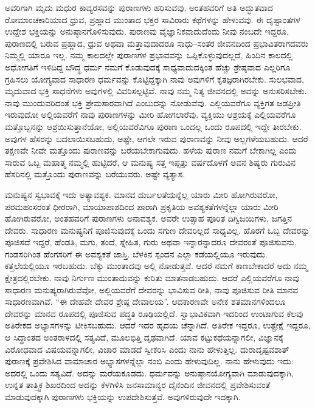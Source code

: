 \vskip 5pt

ಅವರಿಗಾಗಿ ಮೃದು ಮಧುರ ಕಾವ್ಯರಸವನ್ನು ಪುರಾಣಗಳು ಹರಿಸುವವು. ಅಂತಹವರಿಗೆ ಅತಿ ಅದ್ಭುತವಾದ ರೋಮಾಂಚಕಾರಿಯಾದ ಧ್ರುವ, ಪ್ರಹ್ಲಾದ ಮುಂತಾದ ಭಕ್ತರ ಸಾವಿರಾರು ಕಥೆಗಳನ್ನು ಹೇಳುವವು. ಈ ದೃಷ್ಟಾಂತಗಳ ಉದ್ದೇಶ ಭಕ್ತಿಯನ್ನು ಅನುಷ್ಠಾನಗೊಳಿಸುವುದು. ಪುರಾಣವು ವೈಜ್ಞಾನಿಕವಾದುದೆಂದು ನೀವು ನಂಬದೇ ಇದ್ದರೂ, ಪುರಾಣದಲ್ಲಿ ಬರುವ ಪ್ರಹ್ಲಾದ, ಧ್ರುವ ಅಥವಾ ಮತ್ತಾವುದಾದರೂ ಸಾಧು–ಸಂತರ ಜೀವನದಿಂದ ಪ್ರಭಾವಿತರಾಗದವರು ನಿಮ್ಮಲ್ಲಿ ಯಾರೂ ಇಲ್ಲ. ನಮ್ಮ ಕಾಲದಲ್ಲೇ ಪುರಾಣಗಳ ಪ್ರಭಾವವನ್ನು ಒಪ್ಪಿಕೊಳ್ಳುವುದಲ್ಲದೆ, ಹಿಂದಿನ ಕಾಲದಲ್ಲಿ ಅಧೋಗತಿಗೆ ಇಳಿದಿದ್ದ ಬೌದ್ಧ ಧರ್ಮ ನಮಗೆ ಕೊಡುವುದಕ್ಕೆ ಸಾಧ್ಯವಾದುದಕ್ಕಿಂತ ಹೆಚ್ಚು ಶ್ರೇಷ್ಠವಾದ ಎಲ್ಲರಿಗೂ ಗ್ರಹಿಸಲು ಯೋಗ್ಯವಾದ ಸಾಧಾರಣ ಧರ್ಮವನ್ನು ಕೊಟ್ಟಿದ್ದಕ್ಕಾಗಿ ನಾವು ಅವುಗಳಿಗೆ ಕೃತಜ್ಞರಾಗಿರಬೇಕು. ಸುಲಭವಾದ, ಮೃದುವಾದ ಭಕ್ತಿ ಸಾಧನೆಗಳು ಅವುಗಳಲ್ಲಿ ವಿವರಿಸಲ್ಪಟ್ಟಿವೆ. ನಾವು ನಮ್ಮ ನಿತ್ಯ ಜೀವನದಲ್ಲಿ ಅವನ್ನು ಅನುಸರಿಸಬೇಕು. ನಾವು ಮುಂದುವರಿದಂತೆ ಭಕ್ತಿ ಪ್ರೇಮಸಾರವಾಗಿದೆ ಎಂಬುದನ್ನು ನೋಡುವೆವು. ಎಲ್ಲಿಯವರೆಗೂ ವ್ಯಕ್ತಿಗತ ಜಡಪ್ರೀತಿ ಇರುವುದೋ ಅಲ್ಲಿಯವರೆಗೆ ನಾವು ಪುರಾಣಗಳನ್ನು ಮೀರಿ ಹೋಗಲಾರೆವು. ವ್ಯಕ್ತಿಯು ಆಶ್ರಯಕ್ಕೆ ಎಲ್ಲಿಯವರೆಗೂ ಮತ್ತೊಬ್ಬನನ್ನು ಆಶ್ರಯಿಸುತ್ತಾನೆಯೋ, ಅಲ್ಲಿಯವರೆವಿಗೂ ಪುರಾಣ ಒಂದಲ್ಲ ಒಂದು ರೂಪದಲ್ಲಿ ಇದ್ದೇ ತೀರಬೇಕು. ಅವುಗಳ ಹೆಸರನ್ನು ಬದಲಾಯಿಸಬಹುದು, ಅಷ್ಟೇ, ಆಗಲೇ ಇರುವ ಪುರಾಣವನ್ನು ನೀವು ಅಲ್ಲಗಳೆಯಬಹುದು. ಆದರೆ ತಕ್ಷಣವೇ ನೀವೇ ಮತ್ತೊಂದು ಪುರಾಣವನ್ನು ಬರೆಯಬೇಕಾಗುವುದು. ಹಳೆಯ ಪುರಾಣ ನಮಗೆ ಬೇಕಾಗಿಲ್ಲ ಎಂದು ಸಾರುವ ಒಬ್ಬ ಮಹಾತ್ಮ ನಮ್ಮಲ್ಲಿ ಹುಟ್ಟಿದರೆ, ಆ ಮನುಷ್ಯ ಸತ್ತ ಇಪ್ಪತ್ತು ವರ್ಷದೊಳಗೆ ಅವನ ಶಿಷ್ಯರು ಗುರುವಿನ ಹೆಸರಿನಲ್ಲಿ ಮತ್ತೊಂದು ಪುರಾಣವನ್ನು ಬರೆಯುವರು. ಅಷ್ಟೇ ವ್ಯತ್ಯಾಸ.

ಮನುಷ್ಯನ ಸ್ವಭಾವಕ್ಕೆ ಇದು ಅತ್ಯಾವಶ್ಯಕ. ಮಾನವ ದುರ್ಬಲತೆಯನ್ನೆಲ್ಲ ಯಾರು ಮೀರಿ ಹೋಗಿರುವರೋ, ಪರಮಹಂಸರಂತೆ ಧೀರರಾಗಿ, ಮಾಯಾಪಾಶದಿಂದ ಪಾರಾಗಿ ಪ್ರಕೃತಿಯ ಅವಶ್ಯಕತೆಗಳನ್ನೆಲ್ಲಾ ಯಾರು ಮೀರಿ ಹೋಗಿರುವರೋ, ಅಂತಹವರಿಗೆ ಪುರಾಣಗಳು ಅನಾವಶ್ಯಕ. ಅವರೇ ಉತ್ಸಾಹ ಪೂರಿತ ದಿಗ್ವಿಜಯಿಗಳು, ಜಗತ್ತಿನ ದೇವರು. ಸಾಧಾರಣ ಮನುಷ್ಯನಿಗೆ ಪೂಜಿಸುವುದಕ್ಕೆ ಒಂದು ಸಗುಣ ದೇವರಿಲ್ಲದೆ ಸಾಧ್ಯವಿಲ್ಲ. ಹೊರಗೆ ಒಬ್ಬ ದೇವರನ್ನು ಪೂಜಿಸದೆ ಇದ್ದರೆ, ಹೆಂಡತಿ, ಮಗು, ತಂದೆ, ಸ್ನೇಹಿತ, ಗುರು ಅಥವಾ ಇನ್ನಾರನ್ನಾದರೂ ದೇವರಂತೆ ಪೂಜಿಸುವನು. ಗಂಡಸರಿಗಿಂತ ಹೆಂಗಸರಿಗೆ ಈ ಅವಶ್ಯಕತೆ ಜಾಸ್ತಿ. ಬೆಳಕಿನ ಸ್ಪಂದನ ಎಲ್ಲಾ ಕಡೆಯಲ್ಲಿಯೂ ಇರುವುದು. ಕತ್ತಲೆಯಲ್ಲಿಯೂ ಇರಬಹುದು. ಬೆಕ್ಕು ಮುಂತಾದವು ಅಲ್ಲಿ ನೋಡುತ್ತವೆ. ಆದರೆ ನಮಗೆ ಕಾಣಬೇಕಾದರೆ ಅದು ನಮ್ಮ ಕ್ಷೇತ್ರದಲ್ಲಿರಬೇಕು. ನಾವು ನಿರ್ಗುಣ ಮುಂತಾದುವನ್ನು ಕುರಿತು ಮಾತನಾಡಬಹುದು. ಆದರೆ ಎಲ್ಲಿಯವರೆಗೂ ನಾವು ಸಾಧಾರಣ ಮನುಷ್ಯರಾಗಿರುವೆವೋ, ಅಲ್ಲಿಯವರೆಗೆ ದೇವರನ್ನು ಭಾವಿಸುವ ರೀತಿ, ನಾವು ಪೂಜಿಸುವ ರೀತಿ ಮಾನವ ಸಾಧಾರಣವಾಗಿವೆ. “ಈ ದೇಹವೇ ದೇವರ ಶ್ರೇಷ್ಠ ದೇವಾಲಯ”. ಆದಕಾರಣವೇ ಅನೇಕ ಶತಮಾನಗಳಿಂದಲೂ ದೇವರನ್ನು ಮಾನವ ರೂಪದಲ್ಲಿ ಪೂಜಿಸುವ ಪದ್ಧತಿ ರೂಢಿಯಲ್ಲಿದೆ. ಸ್ವಾಭಾವಿಕವಾಗಿ ಇದರಿಂದ ಉಂಟಾಗುವ ಕೆಲವು ಅತಿರೇಕದ ಅಭ್ಯಾಸಗಳನ್ನು ಟೀಕಿಸಬಹುದು. ಆದರೆ ಇದರ ಹೃದಯ ಚೆನ್ನಾಗಿದೆ. ಅತಿರೇಕ ಇದ್ದರೂ, ಉತ್ಪ್ರೇಕ್ಷೆ ಇದ್ದರೂ, ಆ ಸಿದ್ಧಾಂತದ ಅಂತರಾಳದಲ್ಲಿ ಸತ್ಯವಿದೆ, ಮೂಲಭಿತ್ತಿ ದೃಢವಾಗಿದೆ. ಯಾವ ಕಟ್ಟುಕಥೆಯನ್ನಾಗಲೀ, ವಿಜ್ಞಾನಕ್ಕೆ ವಿರೋಧವಾದ ವಿಷಯವನ್ನಾಗಲೀ, ವಿಚಾರ ಮಾಡದೆ ಸ್ವೀಕರಿಸಿ ಎಂದು ನಾನು ಹೇಳುತ್ತಿಲ್ಲ. ದುರಾದೃಷ್ಟವಶಾತ್​ ಪುರಾಣಕ್ಕೆ ಪ್ರವೇಶಿಸಿದ ವಾಮಾಚಾರ ಅಭ್ಯಾಸಗಳನ್ನೆಲ್ಲಾ ನಂಬಿ ಎಂದು ಹೇಳುವುದಿಲ್ಲ. ನಾನು ಹೇಳುವುದು ಇದು: ಅದರಲ್ಲಿ ಒಂದು ಸತ್ಯವಿದೆ. ಅದನ್ನು ಮರೆಯಕೂಡದು. ಧರ್ಮವನ್ನು ಅನುಷ್ಠಾನಯೋಗ್ಯವಾಗಿ ಮಾಡುವುದಕ್ಕಾಗಿ, ಉನ್ನತ ತಾತ್ತ್ವಿಕ ಶಿಖರದಿಂದ ಅದನ್ನು ಕೆಳಗಿಳಿಸಿ ಜನಸಾಮಾನ್ಯರ ದೈನಂದಿನ ಜೀವನದಲ್ಲಿ ಪ್ರವೇಶಿಸುವಂತೆ ಮಾಡುವುದಕ್ಕಾಗಿ ಪುರಾಣಗಳು ಭಕ್ತಿಯನ್ನು ಉಪದೇಶಿಸುತ್ತವೆ. ಅವುಗಳಿರುವುದೇ ಇದಕ್ಕಾಗಿ.

